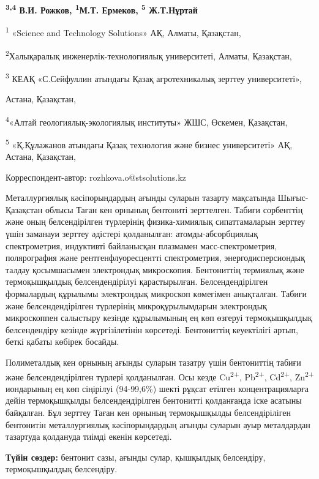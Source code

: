 \textbf{\textsuperscript{3,4} В.И. Рожков, \textsuperscript{1}М.Т.
Ермеков, \textsuperscript{5} Ж.Т.Нұртай}

\textsuperscript{1} «Science and Technology Solutions» АҚ, Алматы,
Қазақстан,

\textsuperscript{2}Халықаралық инженерлік-технологиялық университеті,
Алматы, Қазақстан,

\textsuperscript{3} КЕАҚ «С.Сейфуллин атындағы Қазақ агротехникалық
зерттеу университеті»,

Астана, Қазақстан,

\textsuperscript{4}«Алтай геологиялық-экологиялық институты» ЖШС,
Өскемен, Қазақстан,

\textsuperscript{5} «Қ.Құлажанов атындағы Қазақ технология және бизнес
университеті» АҚ, Астана, Қазақстан,

Корреспондент-автор: rozhkova.o@stsolutions.kz

Металлургиялық кәсіпорындардың ағынды суларын тазарту мақсатында
Шығыс-Қазақстан облысы Таған кен орнының бентониті зерттелген. Табиғи
сорбенттің және оның белсендірілген түрлерінің физика-химиялық
сипаттамаларын зерттеу үшін заманауи зерттеу әдістері қолданылған:
атомды-абсорбциялық спектрометрия, индуктивті байланысқан плазмамен
масс-спектрометрия, полярография және рентгенфлуоресцентті
спектрометрия, энергодисперсиондық талдау қосымшасымен электрондық
микроскопия. Бентониттің термиялық және термоқышқылдық белсендендірілуі
қарастырылған. Белсендендірілген формалардың құрылымы электрондық
микроскоп көмегімен анықталған. Табиғи және белсендендірілген түрлерінің
микроқұрылымдарын электрондық микроскоппен салыстыру кезінде құрылымының
ең көп өзгеруі термоқышқылдық белсендендіру кезінде жүргізілетінін
көрсетеді. Бентониттің кеуектілігі артып, беткі қабаты көбірек босайды.

Полиметалдық кен орнының ағынды суларын тазатру үшін бентониттің табиғи
және белсендендірілген түрлері қолданылған. Осы кезде
Cu\textsuperscript{2+}, Pb\textsuperscript{2+}, Cd\textsuperscript{2+},
Zn\textsuperscript{2+} иондарының ең көп сіңірілуі (94-99,6\%) шекті
рұқсат етілген концентрацияларға дейін термоқышқылды белсендендірілген
бентонитті қолданғанда іске асатыны байқалған. Бұл зерттеу Таған кен
орнының термоқышқылды белсендіріліген бентонитін металлургиялық
кәсіпорындардың ағынды суларын ауыр металдардан тазартуда қолдануда
тиімді екенін көрсетеді.

\textbf{Түйін сөздер:} бентонит сазы, ағынды сулар, қышқылдық
белсендіру, термоқышқылдық белсендіру.

